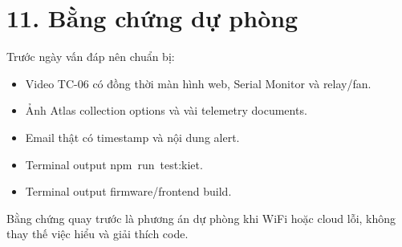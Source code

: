 \documentclass[11pt,oneside,openany]{book}
\renewcommand{\texttt}[1]{{\ttfamily\small #1}}
\providecommand{\tightlist}{\setlength{\itemsep}{1pt}\setlength{\parskip}{0pt}}
\begin{document}
\section{11. Bằng chứng dự
phòng}\label{11-bux1eb1ng-chux1ee9ng-dux1ef1-phuxf2ng}

Trước ngày vấn đáp nên chuẩn bị:

\begin{itemize}
\tightlist
\item
  Video TC-06 có đồng thời màn hình web, Serial Monitor và relay/fan.
\item
  Ảnh Atlas collection options và vài telemetry documents.
\item
  Email thật có timestamp và nội dung alert.
\item
  Terminal output \texttt{npm\ run\ test:kiet}.
\item
  Terminal output firmware/frontend build.
\end{itemize}

Bằng chứng quay trước là phương án dự phòng khi WiFi hoặc cloud lỗi,
không thay thế việc hiểu và giải thích code.
\end{document}
